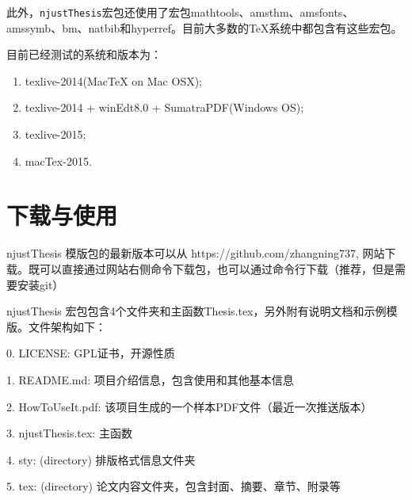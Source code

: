 此外，\texttt{njustThesis}宏包还使用了宏包mathtools、amsthm、amsfonts、amssymb、bm、natbib和hyperref。目前大多数的\TeX{}系统中都包含有这些宏包。

目前已经测试的系统和版本为：
\begin{enumerate}
\item texlive-2014(MacTeX on Mac OSX);

\item texlive-2014 + winEdt8.0 + SumatraPDF(Windows OS);

\item texlive-2015;

\item macTex-2015.

\end{enumerate}

{}

\section{下载与使用}
\label{sec:howtouse}
njustThesis 模版包的最新版本可以从 https://github.com/zhangning737, 网站下载。既可以直接通过网站右侧命令下载包，也可以通过命令行下载（推荐，但是需要安装git）

\begin{center}
  {\color{blue}{git clone https://github.com/zhangning737/njustThesisMaster.git}}
\end{center}


njustThesis 宏包包含4个文件夹和主函数Thesis.tex，另外附有说明文档和示例模版。文件架构如下：

0. LICENSE: GPL证书，开源性质

1. README.md: 项目介绍信息，包含使用和其他基本信息

2. HowToUseIt.pdf: 该项目生成的一个样本PDF文件（最近一次推送版本）

3. njustThesis.tex: 主函数

4. sty: (directory) 排版格式信息文件夹

5. tex: (directory) 论文内容文件夹，包含封面、摘要、章节、附录等

